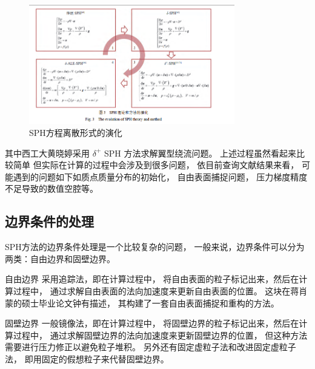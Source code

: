 \begin{frame}
    \begin{figure}[H]
        \centering
        \includegraphics[width=0.8\textwidth]{images/sph离散方程.png}
        \caption{SPH方程离散形式的演化\cite{_sph_2022}}
    \end{figure}
    其中西工大黄晓婷\cite{_sph_2022-3}采用 $\delta^+$ SPH 方法求解翼型绕流问题。
    上述过程虽然看起来比较简单
    但实际在计算的过程中会涉及到很多问题，
    依目前查询文献结果来看，
    可能遇到的问题如下如质点质量分布的初始化\cite{tian_systematic_2017}，
    自由表面捕捉问题\cite{_sph_2022-1}，
    压力梯度精度不足导致的数值空腔\cite{_sph_2022-3}等。
\end{frame}

\subsection{边界条件的处理}

\begin{frame}
    SPH方法的边界条件处理是一个比较复杂的问题，
    一般来说，边界条件可以分为两类：自由边界和固壁边界。
    \begin{block}{自由边界}
        采用追踪法，即在计算过程中，
        将自由表面的粒子标记出来，然后在计算过程中，
        通过求解自由表面的法向加速度来更新自由表面的位置。
        这块在蒋肖蒙\cite{_sph_2022-1}的硕士毕业论文钟有描述，
        其构建了一套自由表面捕捉和重构的方法。
    \end{block}
    \begin{block}{固壁边界}
        一般镜像法，即在计算过程中，
        将固壁边界的粒子标记出来，然后在计算过程中，
        通过求解固壁边界的法向加速度来更新固壁边界的位置，
        但这种方法需要进行压力修正以避免粒子堆积。
        另外还有固定虚粒子法和改进固定虚粒子法，
        即用固定的假想粒子来代替固壁边界。
    \end{block}
\end{frame}

